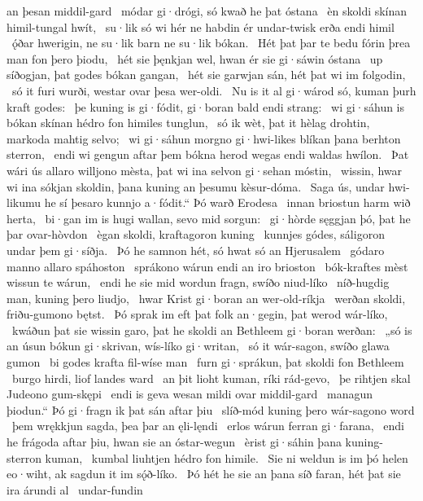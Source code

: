 an þesan middil-gard \hld\ módar gi·drógi,
só kwað he þat óstana \hld\ èn skoldi skínan
himil-tungal hwít, \hld\ su·lik só wi hér ne habdin ér
undar-twisk erða endi himil \hld\ ǫ́ðar hwerigin,
ne su·lik barn ne su·lik bókan. \hld\ Hét þat þar te bedu fórin
þrea man fon þero þiodu, \hld\ hét sie þęnkjan wel,
hwan ér sie gi·sáwin óstana \hld\ up síðogjan,
þat godes bókan gangan, \hld\ hét sie garwjan sán,
hét þat wi im folgodin, \hld\ só it furi wurði,
westar ovar þesa wer-oldi. \hld\ Nu is it al gi·wárod só,
kuman þurh kraft godes: \hld\ þe kuning is gi·fódit,
gi·boran bald endi strang: \hld\ wi gi·sáhun is bókan skínan
hédro fon himiles tunglun, \hld\ só ik wèt, þat it hèlag drohtin,
markoda mahtig selvo; \hld\ wi gi·sáhun morgno gi·hwi-likes
blíkan þana berhton sterron, \hld\ endi wi gengun aftar þem bókna herod
wegas endi waldas hwílon. \hld\ Þat wári ús allaro willjono mèsta,
þat wi ina selvon gi·sehan móstin, \hld\ wissin, hwar wi ina sókjan skoldin,
þana kuning an þesumu kèsur-dóma. \hld\ Saga ús, undar hwi-likumu he sí þesaro kunnjo a·fódit.“
Þó warð Erodesa \hld\ innan briostun
harm wið herta, \hld\ bi·gan im is hugi wallan,
sevo mid sorgun: \hld\ gi·hòrde sęggjan þó,
þat he þar ovar-hòvdon \hld\ ègan skoldi,
kraftagoron kuning \hld\ kunnjes gódes,
sáligoron undar þem gi·síðja. \hld\ Þó he samnon hét,
só hwat só an Hjerusalem \hld\ gódaro manno
allaro spáhoston \hld\ sprákono wárun
endi an iro brioston \hld\ bók-kraftes mèst
wissun te wárun, \hld\ endi he sie mid wordun fragn,
swíðo niud-líko \hld\ níð-hugdig man,
kuning þero liudjo, \hld\ hwar Krist gi·boran
an wer-old-ríkja \hld\ werðan skoldi,
friðu-gumono bętst. \hld\ Þó sprak im eft þat folk an·gegin,
þat werod wár-líko, \hld\ kwáðun þat sie wissin garo,
þat he skoldi an Bethleem gi·boran werðan: \hld\ „só is an úsun bókun gi·skrivan,
wís-líko gi·writan, \hld\ só it wár-sagon,
swíðo glawa gumon \hld\ bi godes krafta
fil-wíse man \hld\ furn gi·sprákun,
þat skoldi fon Bethleem \hld\ burgo hirdi,
liof landes ward \hld\ an þit lioht kuman,
ríki rád-gevo, \hld\ þe rihtjen skal
Judeono gum-skępi \hld\ endi is geva wesan
mildi ovar middil-gard \hld\ managun þiodun.“
Þó gi·fragn ik þat sán aftar þiu \hld\ slíð-mód kuning
þero wár-sagono word \hld\ þem wrękkjun sagda,
þea þar an ęli-lęndi \hld\ erlos wárun
ferran gi·farana, \hld\ endi he frágoda aftar þiu,
hwan sie an óstar-wegun \hld\ èrist gi·sáhin
þana kuning-sterron kuman, \hld\ kumbal liuhtjen
hédro fon himile. \hld\ Sie ni weldun is im þó helen eo·wiht,
ak sagdun it im sǫ́ð-líko. \hld\ Þó hét he sie an þana síð faran,
hét þat sie ira árundi al \hld\ undar-fundin
